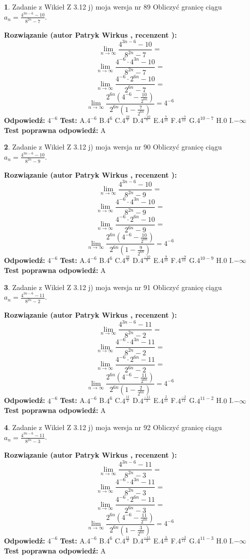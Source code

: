 \documentclass[12pt, a4paper]{article}
\theoremstyle{definition} %
\newtheorem{zad}{}
\newcommand{\zadStart}[1]{\begin{zad}#1\newline}
\newcommand{\zadStop}{\end{zad}}
\newcommand{\rozwStart}[2]{\noindent \textbf{Rozwiązanie (autor #1 , recenzent #2): }\newline}
\newcommand{\rozwStop}{\newline}
\newcommand{\odpStart}{\noindent \textbf{Odpowiedź:}\newline}
\newcommand{\odpStop}{\newline}
\newcommand{\testStart}{\noindent \textbf{Test:}\newline}
\newcommand{\testStop}{\newline}
\newcommand{\kluczStart}{\noindent \textbf{Test poprawna odpowiedź:}\newline}
\newcommand{\kluczStop}{\newline}
\begin{document}
\zadStart{Zadanie z Wikieł Z 3.12 j) moja wersja nr 89}
Obliczyć granicę ciągu $a_{n}=\frac{4^{3n-6}-10}{8^{2n}-7}$.
\zadStop
\rozwStart{Patryk Wirkus}{}
$$\lim\limits_{n\to\infty}\frac{4^{3n-6}-10}{8^{2n}-7}=$$
$$\lim\limits_{n\to\infty}\frac{4^{-6} \cdot 4^{3n}-10}{8^{2n}-7}=$$
$$\lim\limits_{n\to\infty}\frac{4^{-6} \cdot 2^{6n}-10}{2^{6n}-7}=$$
$$\lim\limits_{n\to\infty}\frac{2^{6n}(4^{-6} - \frac{10}{2^{6n}})}{2^{6n}(1-\frac{7}{2^{6n}})}= 4^{-6}$$
\rozwStop
\odpStart
$4^{-6}$
\odpStop
\testStart
A.$4^{-6}$
B.$4^{6}$
C.$4^{\frac{10}{7}}$
D.$4^{\frac{-10}{7}}$
E.$4^{\frac{7}{10}}$
F.$4^{\frac{-7}{10}}$
G.$4^{10-7}$
H.$0$
I.$-\infty$
\testStop
\kluczStart
A
\kluczStop



\zadStart{Zadanie z Wikieł Z 3.12 j) moja wersja nr 90}
Obliczyć granicę ciągu $a_{n}=\frac{4^{3n-6}-10}{8^{2n}-9}$.
\zadStop
\rozwStart{Patryk Wirkus}{}
$$\lim\limits_{n\to\infty}\frac{4^{3n-6}-10}{8^{2n}-9}=$$
$$\lim\limits_{n\to\infty}\frac{4^{-6} \cdot 4^{3n}-10}{8^{2n}-9}=$$
$$\lim\limits_{n\to\infty}\frac{4^{-6} \cdot 2^{6n}-10}{2^{6n}-9}=$$
$$\lim\limits_{n\to\infty}\frac{2^{6n}(4^{-6} - \frac{10}{2^{6n}})}{2^{6n}(1-\frac{9}{2^{6n}})}= 4^{-6}$$
\rozwStop
\odpStart
$4^{-6}$
\odpStop
\testStart
A.$4^{-6}$
B.$4^{6}$
C.$4^{\frac{10}{9}}$
D.$4^{\frac{-10}{9}}$
E.$4^{\frac{9}{10}}$
F.$4^{\frac{-9}{10}}$
G.$4^{10-9}$
H.$0$
I.$-\infty$
\testStop
\kluczStart
A
\kluczStop



\zadStart{Zadanie z Wikieł Z 3.12 j) moja wersja nr 91}
Obliczyć granicę ciągu $a_{n}=\frac{4^{3n-6}-11}{8^{2n}-2}$.
\zadStop
\rozwStart{Patryk Wirkus}{}
$$\lim\limits_{n\to\infty}\frac{4^{3n-6}-11}{8^{2n}-2}=$$
$$\lim\limits_{n\to\infty}\frac{4^{-6} \cdot 4^{3n}-11}{8^{2n}-2}=$$
$$\lim\limits_{n\to\infty}\frac{4^{-6} \cdot 2^{6n}-11}{2^{6n}-2}=$$
$$\lim\limits_{n\to\infty}\frac{2^{6n}(4^{-6} - \frac{11}{2^{6n}})}{2^{6n}(1-\frac{2}{2^{6n}})}= 4^{-6}$$
\rozwStop
\odpStart
$4^{-6}$
\odpStop
\testStart
A.$4^{-6}$
B.$4^{6}$
C.$4^{\frac{11}{2}}$
D.$4^{\frac{-11}{2}}$
E.$4^{\frac{2}{11}}$
F.$4^{\frac{-2}{11}}$
G.$4^{11-2}$
H.$0$
I.$-\infty$
\testStop
\kluczStart
A
\kluczStop



\zadStart{Zadanie z Wikieł Z 3.12 j) moja wersja nr 92}
Obliczyć granicę ciągu $a_{n}=\frac{4^{3n-6}-11}{8^{2n}-3}$.
\zadStop
\rozwStart{Patryk Wirkus}{}
$$\lim\limits_{n\to\infty}\frac{4^{3n-6}-11}{8^{2n}-3}=$$
$$\lim\limits_{n\to\infty}\frac{4^{-6} \cdot 4^{3n}-11}{8^{2n}-3}=$$
$$\lim\limits_{n\to\infty}\frac{4^{-6} \cdot 2^{6n}-11}{2^{6n}-3}=$$
$$\lim\limits_{n\to\infty}\frac{2^{6n}(4^{-6} - \frac{11}{2^{6n}})}{2^{6n}(1-\frac{3}{2^{6n}})}= 4^{-6}$$
\rozwStop
\odpStart
$4^{-6}$
\odpStop
\testStart
A.$4^{-6}$
B.$4^{6}$
C.$4^{\frac{11}{3}}$
D.$4^{\frac{-11}{3}}$
E.$4^{\frac{3}{11}}$
F.$4^{\frac{-3}{11}}$
G.$4^{11-3}$
H.$0$
I.$-\infty$
\testStop
\kluczStart
A
\kluczStop
\end{document}
